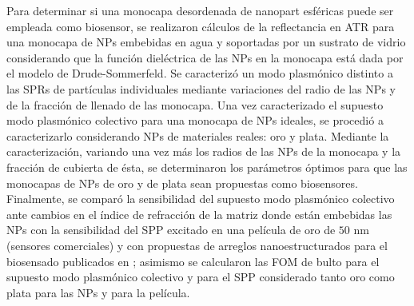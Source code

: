 Para determinar si una monocapa desordenada de nanopart esféricas puede ser empleada como biosensor, se realizaron cálculos de la reflectancia en ATR para una monocapa de NPs embebidas en agua y soportadas por un sustrato de vidrio considerando que la función dieléctrica de las NPs en la monocapa está dada por el modelo de Drude-Sommerfeld. Se caracterizó un modo plasmónico distinto a las SPRs de partículas individuales mediante variaciones del radio de las NPs y de la fracción de llenado de las monocapa. Una vez caracterizado el supuesto modo plasmónico colectivo para una monocapa de NPs ideales, se procedió a caracterizarlo considerando NPs de materiales reales: oro y plata. Mediante la caracterización, variando una vez más los radios de las NPs de la monocapa y la fracción de cubierta de ésta, se determinaron los parámetros óptimos para que las monocapas de NPs de oro y de plata sean propuestas como biosensores. Finalmente, se comparó la sensibilidad del supuesto modo plasmónico colectivo ante cambios en el índice de refracción de la matriz donde están embebidas las NPs con la sensibilidad del SPP excitado en una película de oro de $50$ nm (sensores comerciales) y con propuestas de arreglos nanoestructurados para el biosensado publicados en \cite{kabashin2009plasmonic,danilov2018ultra,svedendahl2009refractometric}; asimismo se calcularon las FOM de bulto para el supuesto modo plasmónico colectivo y para el SPP considerado tanto oro como plata para las NPs y para la película.

